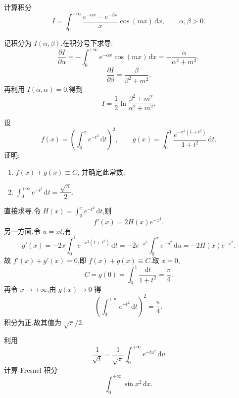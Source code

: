 \begin{example}
    计算积分
    \[
        I=\int_0^{+\infty}\dfrac{e^{-\alpha x}-e^{-\beta x}}{x}\cos(mx)\,\mathrm{d}x,
        \qquad \alpha,\beta>0.
    \]
\end{example}
\exampleblank

\begin{solution}
    记积分为 $I(\alpha,\beta)$.在积分号下求导:
    \[
        \dfrac{\partial I}{\partial\alpha}
        =-\int_0^{+\infty}e^{-\alpha x}\cos(mx)\,\mathrm{d}x
        =-\dfrac{\alpha}{\alpha^2+m^2},
    \]
    \[
        \dfrac{\partial I}{\partial\beta}
        =\dfrac{\beta}{\beta^2+m^2}.
    \]
    再利用 $I(\alpha,\alpha)=0$,得到
    \[
        I=\dfrac{1}{2}\ln\dfrac{\beta^2+m^2}{\alpha^2+m^2}.
    \]
\end{solution}

\begin{example}
    设
    \[
        f(x)=\left(\int_0^x e^{-t^2}\,\mathrm{d}t\right)^2,
        \qquad
        g(x)=\int_0^1\dfrac{e^{-x^2(1+t^2)}}{1+t^2}\,\mathrm{d}t.
    \]
    证明:
    \begin{enumerate}
        \item $f(x)+g(x)\equiv C$, 并确定此常数;
        \item $\displaystyle\int_0^{+\infty}e^{-t^2}\,\mathrm{d}t=\dfrac{\sqrt{\pi}}{2}$.
    \end{enumerate}
\end{example}
\exampleblank

\begin{solution}
    直接求导.令 $H(x)=\displaystyle\int_0^xe^{-t^2}\,\mathrm{d}t$,则
    \[
        f'(x)=2H(x)e^{-x^2}.
    \]
    另一方面,令 $u=xt$,有
    \[
        g'(x)=-2x\int_0^1e^{-x^2(1+t^2)}\,\mathrm{d}t
        =-2e^{-x^2}\int_0^xe^{-u^2}\,\mathrm{d}u=-2H(x)e^{-x^2}.
    \]
    故 $f'(x)+g'(x)=0$,即 $f(x)+g(x)\equiv C$.取 $x=0$,
    \[
        C=g(0)=\int_0^1\dfrac{\mathrm{d}t}{1+t^2}=\dfrac{\pi}{4}.
    \]
    再令 $x\to+\infty$,由 $g(x)\to0$ 得
    \[
        \left(\int_0^{+\infty}e^{-t^2}\,\mathrm{d}t\right)^2=\dfrac{\pi}{4}.
    \]
    积分为正,故其值为 $\sqrt\pi/2$.
\end{solution}

\begin{example}
    利用
    \[
        \dfrac{1}{\sqrt{t}}=\dfrac{1}{\sqrt{\pi}}\int_0^{+\infty}e^{-tu^2}\,\mathrm{d}u
    \]
    计算 Fresnel 积分
    \[
        \displaystyle\int_0^{+\infty}\sin x^2\,\mathrm{d}x.
    \]
\end{example}
\exampleblank

